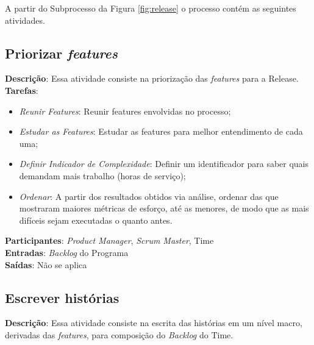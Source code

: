 A partir do Subprocesso da Figura \ref{fig:release} o processo contém as seguintes atividades.

\subsection{Priorizar \textit{features}}
  \textbf{Descrição}: Essa atividade consiste na priorização das \textit{features} para a Release. \\

  \textbf{Tarefas}:
  \begin{itemize}
   \item \indent \textit{Reunir Features}: Reunir features envolvidas no processo;

   \item \indent \textit{Estudar as Features}: Estudar as features para melhor entendimento de cada uma;

   \item \indent \textit{Definir Indicador de Complexidade}: Definir um identificador para saber quais demandam mais trabalho (horas de serviço);

   \item \indent \textit{Ordenar}: A partir dos resultados obtidos via análise, ordenar das que mostraram maiores métricas de esforço, até as menores, de modo que as mais difíceis sejam executadas o quanto antes.
  \end{itemize}

  \textbf{Participantes}: \textit{Product Manager}, \textit{Scrum Master}, Time\\

  \textbf{Entradas}: \textit{Backlog} do Programa \\

  \textbf{Saídas}:  Não se aplica\\

\subsection{Escrever histórias}
  \textbf{Descrição}: Essa atividade consiste na escrita das histórias em um nível macro, derivadas das \textit{features}, para composição do \textit{Backlog} do Time. \\

